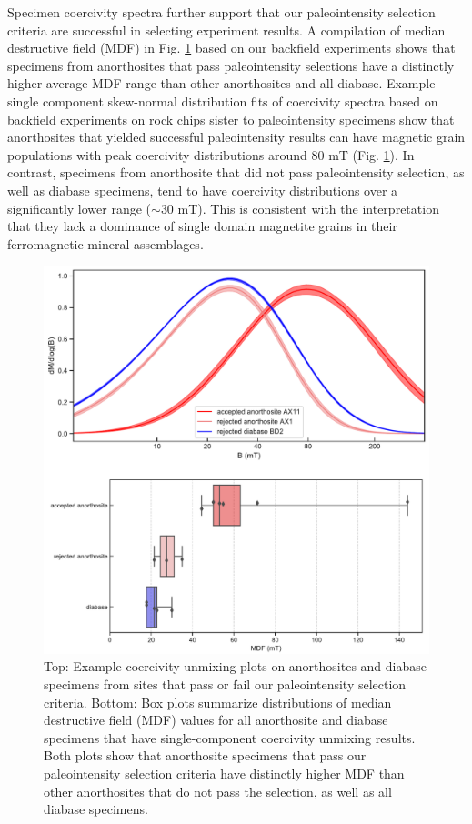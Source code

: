 \documentclass[9pt,twocolumn,twoside,lineno]{pnas-new}
\begin{document}
Specimen coercivity spectra further support that our paleointensity selection criteria are successful in selecting experiment results. A compilation of median destructive field (MDF) in Fig. \ref{fig:coercivity} based on our backfield experiments shows that specimens from anorthosites that pass paleointensity selections have a distinctly higher average MDF range than other anorthosites and all diabase. Example single component skew-normal distribution fits of coercivity spectra based on backfield experiments on rock chips sister to paleointensity specimens show that anorthosites that yielded successful paleointensity results can have magnetic grain populations with peak coercivity distributions around 80 mT (Fig. \ref{fig:coercivity}). In contrast, specimens from anorthosite that did not pass paleointensity selection, as well as diabase specimens, tend to have coercivity distributions over a significantly lower range ($\sim$30 mT). This is consistent with the interpretation that they lack a dominance of single domain magnetite grains in their ferromagnetic mineral assemblages.

\begin{figure}
\noindent\includegraphics[width=\linewidth]{coercivity.pdf}
\centering
\caption{\footnotesize{Top: Example coercivity unmixing plots on anorthosites and diabase specimens from sites that pass or fail our paleointensity selection criteria. Bottom: Box plots summarize distributions of median destructive field (MDF) values for all anorthosite and diabase specimens that have single-component coercivity unmixing results. Both plots show that anorthosite specimens that pass our paleointensity selection criteria have distinctly higher MDF than other anorthosites that do not pass the selection, as well as all diabase specimens.}}
\label{fig:coercivity}
\end{figure}
\end{document}
